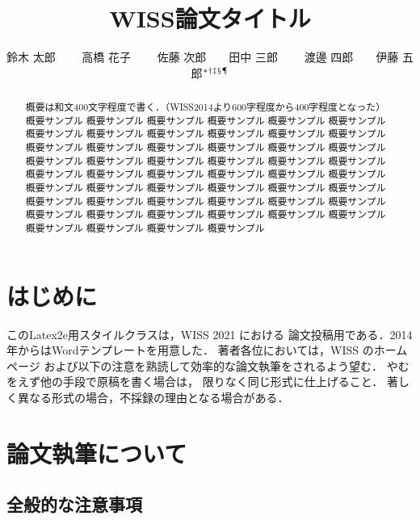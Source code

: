 \documentclass[twoside]{wiss}
\begin{document}
\title{WISS論文タイトル}
\etitle{}%
%
%
%
\author{鈴木 太郎 　　高橋 花子
　　佐藤 次郎　　田中 三郎
　　渡邊 四郎　　伊藤 五郎${}^* {}^\dag {}^\ddag {}^\mathsection
{}^\mathparagraph$}

\begin{abstract}
概要は和文400文字程度で書く．（WISS2014より600字程度から400字程度となった）
概要サンプル 概要サンプル 概要サンプル 概要サンプル 概要サンプル 概要サンプル
概要サンプル 概要サンプル 概要サンプル 概要サンプル 概要サンプル 概要サンプル
概要サンプル 概要サンプル 概要サンプル 概要サンプル 概要サンプル 概要サンプル
概要サンプル 概要サンプル 概要サンプル 概要サンプル 概要サンプル 概要サンプル
概要サンプル 概要サンプル 概要サンプル 概要サンプル 概要サンプル 概要サンプル
概要サンプル 概要サンプル 概要サンプル 概要サンプル 概要サンプル 概要サンプル
概要サンプル 概要サンプル 概要サンプル 概要サンプル 概要サンプル 概要サンプル
概要サンプル 概要サンプル 概要サンプル 概要サンプル 概要サンプル 概要サンプル
概要サンプル 概要サンプル 概要サンプル 概要サンプル
\end{abstract}

\maketitle

\section{はじめに}

このLatex2e用スタイルクラスは，WISS 2021 における
論文投稿用である．2014年からはWordテンプレートを用意した．
著者各位においては，WISS のホームページ\cite{wiss}
および以下の注意を熟読して効率的な論文執筆をされるよう望む．
やむをえず他の手段で原稿を書く場合は，
限りなく同じ形式に仕上げること．
著しく異なる形式の場合，不採録の理由となる場合がある．

\section{論文執筆について}

\subsection{全般的な注意事項}
\end{document}
